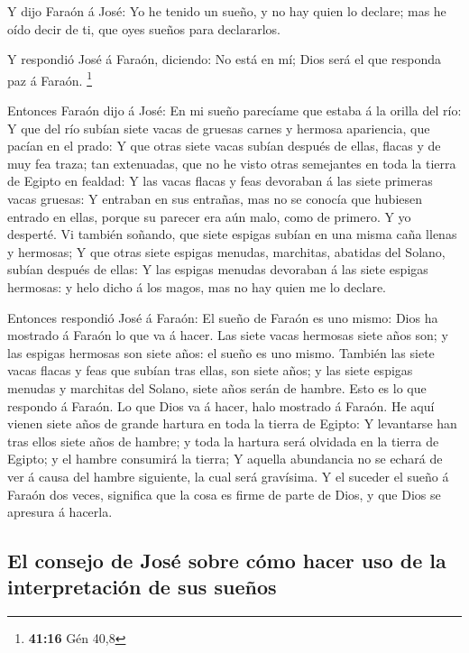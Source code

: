  Y dijo Faraón á José: Yo he tenido un sueño, y no hay
quien lo declare; mas he oído decir de ti, que oyes sueños para
declararlos.

 Y respondió José á Faraón, diciendo: No está en mí; Dios
será el que responda paz á Faraón. \footnote{\textbf{41:16} Gén 40,8}

 Entonces Faraón dijo á José: En mi sueño parecíame que
estaba á la orilla del río:  Y que del río subían siete
vacas de gruesas carnes y hermosa apariencia, que pacían en el prado:
 Y que otras siete vacas subían después de ellas, flacas y
de muy fea traza; tan extenuadas, que no he visto otras semejantes en
toda la tierra de Egipto en fealdad:  Y las vacas flacas y
feas devoraban á las siete primeras vacas gruesas:  Y
entraban en sus entrañas, mas no se conocía que hubiesen entrado en
ellas, porque su parecer era aún malo, como de primero. Y yo desperté.
 Vi también soñando, que siete espigas subían en una misma
caña llenas y hermosas;  Y que otras siete espigas menudas,
marchitas, abatidas del Solano, subían después de ellas:  Y
las espigas menudas devoraban á las siete espigas hermosas: y helo dicho
á los magos, mas no hay quien me lo declare.

 Entonces respondió José á Faraón: El sueño de Faraón es
uno mismo: Dios ha mostrado á Faraón lo que va á hacer. 
Las siete vacas hermosas siete años son; y las espigas hermosas son
siete años: el sueño es uno mismo.  También las siete vacas
flacas y feas que subían tras ellas, son siete años; y las siete espigas
menudas y marchitas del Solano, siete años serán de hambre.
 Esto es lo que respondo á Faraón. Lo que Dios va á hacer,
halo mostrado á Faraón.  He aquí vienen siete años de
grande hartura en toda la tierra de Egipto:  Y levantarse
han tras ellos siete años de hambre; y toda la hartura será olvidada en
la tierra de Egipto; y el hambre consumirá la tierra;  Y
aquella abundancia no se echará de ver á causa del hambre siguiente, la
cual será gravísima.  Y el suceder el sueño á Faraón dos
veces, significa que la cosa es firme de parte de Dios, y que Dios se
apresura á hacerla.

\hypertarget{el-consejo-de-josuxe9-sobre-cuxf3mo-hacer-uso-de-la-interpretaciuxf3n-de-sus-sueuxf1os}{%
\subsection{El consejo de José sobre cómo hacer uso de la interpretación
de sus
sueños}\label{el-consejo-de-josuxe9-sobre-cuxf3mo-hacer-uso-de-la-interpretaciuxf3n-de-sus-sueuxf1os}}

